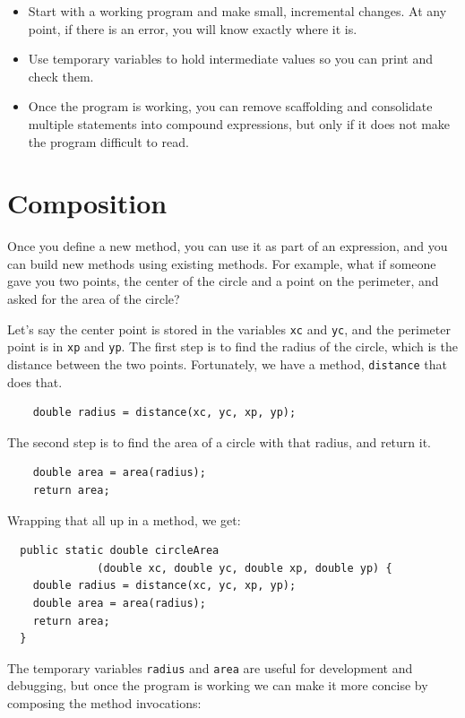 \begin{itemize}

\item Start with a working program and make small, incremental
changes.  At any point, if there is an error, you will know
exactly where it is.

\item Use temporary variables to hold intermediate values so
you can print and check them.

\item Once the program is working, you can remove
scaffolding and consolidate multiple statements into
compound expressions, but only if it does not make the program
difficult to read.

\end{itemize}


\section{Composition}

Once you define a new method,
you can use it as part of an expression, and you can build
new methods using existing methods.  For example, what if someone
gave you two points, the center of the circle and a point on
the perimeter, and asked for the area of the circle?

Let's say the center point is stored in the variables {\tt xc}
and {\tt yc}, and the perimeter point is in {\tt xp} and
{\tt yp}.  The first step is to find the radius of the circle, which
is the distance between the two points.  Fortunately, we have
a method, {\tt distance} that does that.

\begin{lstlisting}
    double radius = distance(xc, yc, xp, yp);
\end{lstlisting}
%
The second step is to find the area of a circle with that
radius, and return it.

\begin{lstlisting}
    double area = area(radius);
    return area;
\end{lstlisting}
%
Wrapping that all up in a method, we get:

\begin{lstlisting}
  public static double circleArea
              (double xc, double yc, double xp, double yp) {
    double radius = distance(xc, yc, xp, yp);
    double area = area(radius);
    return area;
  }
\end{lstlisting}
%
The temporary variables {\tt radius} and {\tt area} are
useful for development and debugging, but once the program is
working we can make it more concise by composing
the method invocations:

